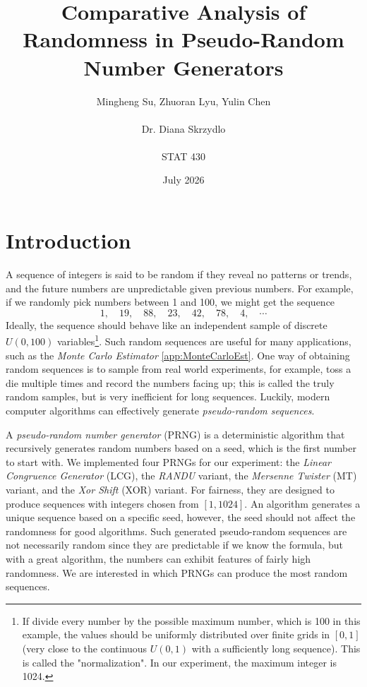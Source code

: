 \documentclass{report}
\title{Comparative Analysis of Randomness in Pseudo-Random Number Generators}
\author{Mingheng Su, Zhuoran Lyu, Yulin Chen\\\\Dr. Diana Skrzydlo \\\\STAT 430 }
\date{July 2026}
\begin{document}


\maketitle

\tableofcontents

\chapter{Introduction}
A sequence of integers is said to be random if they reveal no patterns or trends, and the future numbers are unpredictable given previous numbers. For example, if we randomly pick numbers between 1 and 100, we might get the sequence
\[1, \quad 19, \quad 88, \quad 23, \quad 42, \quad 78, \quad 4, \quad\cdots\]
 Ideally, the sequence should behave like an independent sample of discrete $U(0,100)$ variables\footnote{If divide every number by the possible maximum number, which is 100 in this example, the values should be uniformly distributed over finite grids in $[0,1]$ (very close to the continuous $U(0,1)$ with a sufficiently long sequence). This is called the "normalization". In our experiment, the maximum integer is 1024.}. Such random sequences are useful for many applications, such as the \textit{Monte Carlo Estimator} \eqref{app:MonteCarloEst}. One way of obtaining random sequences is to sample from real world experiments, for example, toss a die multiple times and record the numbers facing up; this is called the truly random samples, but is very inefficient for long sequences. Luckily, modern computer algorithms can effectively generate \textit{pseudo-random sequences}.

A \textit{pseudo-random number generator} (PRNG) is a deterministic algorithm that recursively generates random numbers based on a seed, which is the first number to start with. We implemented four PRNGs for our experiment: the \textit{Linear Congruence Generator} (LCG), the \textit{RANDU} variant, the \textit{Mersenne Twister} (MT) variant, and the \textit{Xor Shift} (XOR) variant. For fairness, they are designed to produce sequences with integers chosen from $[1,1024]$. An algorithm generates a unique sequence based on a specific seed, however, the seed should not affect the randomness for good algorithms. Such generated pseudo-random sequences are not necessarily random since they are predictable if we know the formula, but with a great algorithm, the numbers can exhibit features of fairly high randomness. We are interested in which PRNGs can produce the most random sequences.
\end{document}
